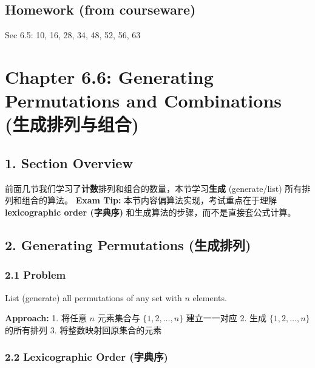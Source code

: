 \documentclass[10pt,a4paper,openany]{ctexbook}
\theoremstyle{definition}
\theoremstyle{remark}
\renewenvironment{quote}
  {\list{}{\leftmargin=1em\rightmargin=0pt\topsep=0.5pt\partopsep=0pt}\item[]}
  {\endlist}
\begin{document}
\vspace{-2pt}

\subsection{Homework (from courseware)}

Sec 6.5: 10, 16, 28, 34, 48, 52, 56, 63


\section{Chapter 6.6: Generating Permutations and Combinations (生成排列与组合)}

\vspace{-2pt}

\subsection{1. Section Overview}

前面几节我们学习了\textbf{计数}排列和组合的数量，本节学习\textbf{生成} (generate/list) 所有排列和组合的算法。
\textbf{Exam Tip:} 本节内容偏算法实现，考试重点在于理解 \textbf{lexicographic order (字典序)} 和生成算法的步骤，而不是直接套公式计算。
\vspace{-2pt}

\subsection{2. Generating Permutations (生成排列)}

\subsubsection{2.1 Problem}

\begin{quote}
List (generate) all permutations of any set with $n$ elements.

\textbf{Approach:}
1. 将任意 $n$ 元素集合与 $\{1, 2, \ldots, n\}$ 建立一一对应
2. 生成 $\{1, 2, \ldots, n\}$ 的所有排列
3. 将整数映射回原集合的元素

\end{quote}

\subsubsection{2.2 Lexicographic Order (字典序)}
\end{document}
